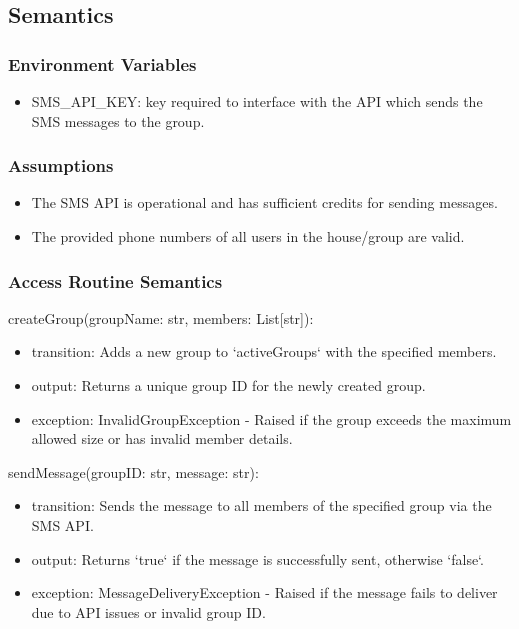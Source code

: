 \documentclass[12pt, titlepage]{article}
\begin{document}
\subsection{Semantics}

\subsubsection{Environment Variables}

\begin{itemize}
\item SMS\_API\_KEY: key required to interface with the API which sends the SMS messages to the group.
\end{itemize}

\subsubsection{Assumptions}

\begin{itemize}
  \item The SMS API is operational and has sufficient credits for sending messages.
  \item The provided phone numbers of all users in the house/group are valid.
\end{itemize}

\subsubsection{Access Routine Semantics}

\noindent createGroup(groupName: str, members: List[str]):
\begin{itemize}
\item transition: Adds a new group to `activeGroups` with the specified members.
\item output: Returns a unique group ID for the newly created group.
\item exception: InvalidGroupException - Raised if the group exceeds the maximum allowed size or has invalid member details.
\end{itemize}

\noindent sendMessage(groupID: str, message: str):
\begin{itemize}
\item transition: Sends the message to all members of the specified group via the SMS API.
\item output: Returns `true` if the message is successfully sent, otherwise `false`.
\item exception: MessageDeliveryException - Raised if the message fails to deliver due to API issues or invalid group ID.
\end{itemize}
\end{document}
